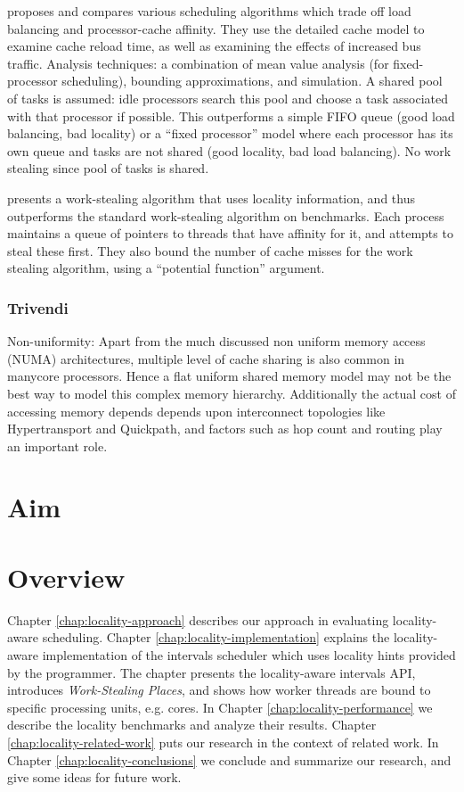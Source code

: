 \cite{Squillante1993} proposes and compares various scheduling
algorithms which trade off load balancing and processor-cache
affinity. They use the detailed cache model to examine cache reload
time, as well as examining the effects of increased bus
traffic. Analysis techniques: a combination of mean value analysis
(for fixed-processor scheduling), bounding approximations, and
simulation. A shared pool of tasks is assumed: idle processors search
this pool and choose a task associated with that processor if
possible. This outperforms a simple FIFO queue (good load balancing,
bad locality) or a ``fixed processor'' model where each processor has
its own queue and tasks are not shared (good locality, bad load
balancing). No work stealing since pool of tasks is shared.

\cite{Acar2002} presents a work-stealing algorithm that uses locality
information, and thus outperforms the standard work-stealing algorithm
on benchmarks. Each process maintains a queue of pointers to threads
that have affinity for it, and attempts to steal these first. They
also bound the number of cache misses for the work stealing algorithm,
using a ``potential function'' argument.

\subsubsection{Trivendi}

Non-uniformity: Apart from the much discussed non uniform memory
access (NUMA) architectures, multiple level of cache sharing is also
common in manycore processors. Hence a flat uniform shared memory
model may not be the best way to model this complex memory hierarchy.
Additionally the actual cost of accessing memory depends depends upon
interconnect topologies like Hypertransport and Quickpath, and factors
such as hop count and routing play an important role.

\section{Aim}
\label{sec:locality-intro-aim}


\section{Overview}
\label{sec:locality-intro-overview}

Chapter \ref{chap:locality-approach} describes our approach in
evaluating locality-aware scheduling. Chapter
\ref{chap:locality-implementation} explains the locality-aware
implementation of the intervals scheduler which uses locality hints
provided by the programmer. The chapter presents the locality-aware
intervals API, introduces \emph{Work-Stealing Places}, and shows how
worker threads are bound to specific processing units, e.g. cores.  In
Chapter \ref{chap:locality-performance} we describe the locality
benchmarks and analyze their results. Chapter
\ref{chap:locality-related-work} puts our research in the context of
related work. In Chapter \ref{chap:locality-conclusions} we conclude
and summarize our research, and give some ideas for future work.



